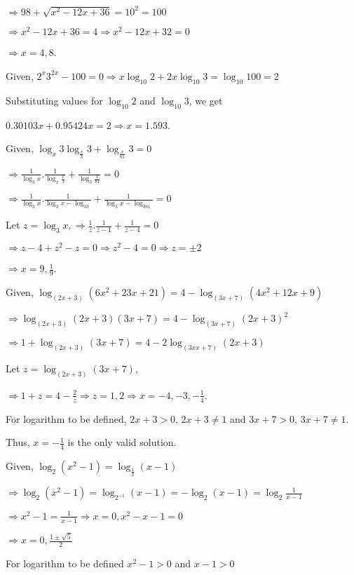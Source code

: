   $\Rightarrow 98 + \sqrt{x^2 - 12x + 36} = 10^2 = 100$

  $\Rightarrow x^2 - 12x + 36 = 4 \Rightarrow x^2 - 12x + 32 = 0$

  $\Rightarrow x = 4, 8$.
\item Given, $2^x3^{2x} - 100 = 0 \Rightarrow x\log_{10}2 + 2x\log_{10}3 = \log_{10}100 = 2$

  Substituting values for $\log_{10}2$ and $\log_{10}3$, we get

  $0.30103x + 0.95424x = 2 \Rightarrow x = 1.593$.
\item Given, $\log_x3\log_{\tfrac{x}{3}}3 + \log_{\tfrac{x}{81}}3 = 0$

  $\Rightarrow \frac{1}{\log_3x}.\frac{1}{\log_x\tfrac{x}{3}} + \frac{1}{\log_3\tfrac{x}{81}} = 0$

  $\Rightarrow \frac{1}{\log_3x}.\frac{1}{\log_3x - \log_33} + \frac{1}{\log_3x - \log_381} = 0$

  Let $z = \log_3x, \Rightarrow \frac{1}{z}.\frac{1}{z - 1} + \frac{1}{z - 4} = 0$

  $\Rightarrow z - 4 + z^2 - z = 0 \Rightarrow z^2 - 4 = 0 \Rightarrow z = \pm 2$

  $\Rightarrow x = 9, \frac{1}{9}$.
\item Given, $\log_{(2x + 3)}(6x^2 + 23x + 21) = 4 - \log_{(3x + 7)}(4x^2 + 12x + 9)$

  $\Rightarrow \log_{(2x + 3)}(2x + 3)(3x + 7) = 4 - \log_{(3x + 7)}(2x + 3)^2$

  $\Rightarrow 1 + \log_{(2x + 3)}(3x + 7) = 4 - 2\log_{(3xx + 7)}(2x + 3)$

  Let $z = \log_{(2x + 3)}(3x + 7)$,

  $\Rightarrow 1 + z = 4 - \frac{2}{z}\Rightarrow z = 1, 2 \Rightarrow x = -4, -3, -\frac{1}{4}$.

  For logarithm to be defined, $2x + 3 > 0,\,2x + 3\neq 1$ and $3x + 7 > 0,\,3x + 7 \neq 1$.

  Thus, $x = -\frac{1}{4}$ is the only valid solution.
\item Given, $\log_2(x^2 - 1) = \log_{\tfrac{1}{2}}(x - 1)$

  $\Rightarrow \log_2(x^2 - 1) = \log_{2^{-1}}(x - 1) = -\log_2(x - 1) = \log_2\frac{1}{x - 1}$

  $\Rightarrow x^2 - 1 = \frac{1}{x - 1}\Rightarrow x = 0, x^2 - x - 1 = 0$

  $\Rightarrow x = 0, \frac{1\pm\sqrt{5}}{2}$

  For logarithm to be defined $x^2 - 1 > 0$ and $x - 1 > 0$

